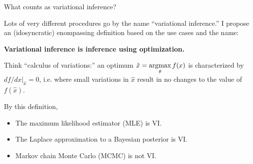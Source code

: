 

\begin{frame}{What counts as variational inference?}

Lots of very different procedures go by the name ``variational inference.''
%
I propose an (idosyncratic) enompassing definition based on the use cases and
the name:

\begin{center}
\textbf{Variational inference is inference
using optimization.}
\end{center}

%
Think ``calculus of variations:'' an optimum $\hat{x} = \underset{\theta}{\mathrm{argmax}}\, f(x)$ is
characterized by $df / dx |_{\hat{x}} = 0$, i.e.  where small variations in
$\hat{x}$ result in no changes to the value of $f(\hat{x})$.
%

\begin{center}
\end{center}


\begin{minipage}[t]{0.2\textwidth}
By this definition,
\end{minipage}
%
\begin{minipage}[t]{0.8\textwidth}
    \vspace{-0.65em}
\begin{itemize}
    \item The maximum likelihood estimator (MLE) is VI.
    \item The Laplace approximation to a Bayesian posterior is VI.
    \item Markov chain Monte Carlo (MCMC) is not VI.
\end{itemize}
\end{minipage}
\hspace{-2em}

\end{frame}


